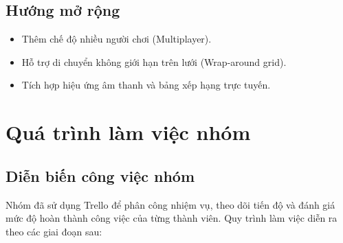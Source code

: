 \documentclass[a4paper, 12pt]{article}
\begin{document}
\subsection{Hướng mở rộng}
\begin{itemize}
    \item Thêm chế độ nhiều người chơi (Multiplayer).
    \item Hỗ trợ di chuyển không giới hạn trên lưới (Wrap-around grid).
    \item Tích hợp hiệu ứng âm thanh và bảng xếp hạng trực tuyến.
\end{itemize}



\newpage
\section{Quá trình làm việc nhóm}


\subsection{Diễn biến công việc nhóm}
Nhóm đã sử dụng Trello để phân công nhiệm vụ, theo dõi tiến độ và đánh giá mức độ hoàn thành công việc của từng thành viên. Quy trình làm việc diễn ra theo các giai đoạn sau:
\end{document}
